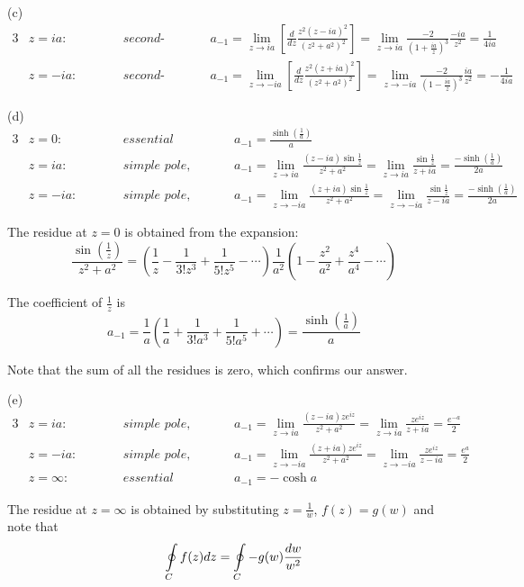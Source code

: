 \documentclass[a4paper]{article}
\begin{document}
(c)
\begin{alignat*}{3}
    & z=ia:\qquad && \textit{second-order pole,}\qquad && a_{-1}=\lim_{z\to ia}\left[\frac{d}{dz}\frac{z^2(z-ia)^2}{(z^2+a^2)^2} \right]=\lim_{z\to ia}\frac{-2}{(1+\frac{ia}{z})^3}\frac{-ia}{z^2}=\frac{1}{4ia}\\
    & z=-ia:\qquad && \textit{second-order pole,}\qquad && a_{-1}=\lim_{z\to -ia}\left[\frac{d}{dz}\frac{z^2(z+ia)^2}{(z^2+a^2)^2} \right]=\lim_{z\to -ia}\frac{-2}{(1-\frac{ia}{z})^3}\frac{ia}{z^2}=-\frac{1}{4ia}
\end{alignat*}

(d)
\begin{alignat*}{3}
    & z=0:\qquad && \textit{essential singularity,}\qquad && a_{-1}=\frac{\sinh(\frac{1}{a})}{a} \\
    & z=ia:\qquad && \textit{simple pole,}\qquad && a_{-1}=\lim_{z\to ia}\frac{(z-ia)\sin\frac{1}{z}}{z^2+a^2}=\lim_{z\to ia}\frac{\sin\frac{1}{z}}{z+ia}=\frac{-\sinh(\frac{1}{a})}{2a}\\
    & z=-ia:\qquad && \textit{simple pole,}\qquad && a_{-1}=\lim_{z\to -ia}\frac{(z+ia)\sin\frac{1}{z}}{z^2+a^2}=\lim_{z\to -ia}\frac{\sin\frac{1}{z}}{z-ia}=\frac{-\sinh(\frac{1}{a})}{2a}
\end{alignat*}

The residue at $z=0$ is obtained from the expansion:
\[
\frac{\sin(\frac{1}{z})}{z^2+a^2}=\left(\frac{1}{z}-\frac{1}{3!z^3}+\frac{1}{5!z^5}-\cdots \right)\frac{1}{a^2}\left(1-\frac{z^2}{a^2}+\frac{z^4}{a^4}-\cdots \right)
\]

The coefficient of $\frac{1}{z}$ is 
\[
a_{-1}=\frac{1}{a}\left(\frac{1}{a}+\frac{1}{3!a^3}+\frac{1}{5!a^5}+\cdots \right)=\frac{\sinh(\frac{1}{a})}{a}
\]

Note that the sum of all the residues is zero, which confirms our answer.
\medskip

(e)
\begin{alignat*}{3}
    & z=ia:\qquad && \textit{simple pole,}\qquad && a_{-1}=\lim_{z\to ia}\frac{(z-ia)ze^{iz}}{z^2+a^2}=\lim_{z\to ia}\frac{ze^{iz}}{z+ia}=\frac{e^{-a}}{2}\\
    & z=-ia:\qquad && \textit{simple pole,}\qquad && a_{-1}=\lim_{z\to -ia}\frac{(z+ia)ze^{iz}}{z^2+a^2}=\lim_{z\to -ia}\frac{ze^{iz}}{z-ia}=\frac{e^{a}}{2}\\
    & z=\infty:\qquad && \textit{essential singularity,}\qquad && a_{-1}=-\cosh a
\end{alignat*}

The residue at $z=\infty$ is obtained by substituting $z=\frac{1}{w}$,\; $f(z)=g(w)$ and note that
\[
\oint\displaylimits_Cf(z)dz=\oint\displaylimits_C-g(w)\frac{dw}{w^2}
\]
\end{document}
